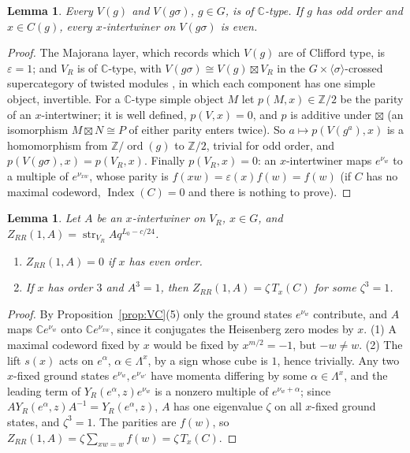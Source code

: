 \documentclass[11pt]{amsart}
\newtheorem{lemma}[theorem]{Lemma}
\theoremstyle{definition}
\newcommand{\Z}{\mathbb{Z}}
\newcommand{\C}{\mathbb{C}}
\newcommand{\Index}{\operatorname{Index}}
\newcommand{\str}{\operatorname{str}}
\begin{document}
\begin{lemma}\label{lem:evenness}
Every $V(g)$ and $V(g\sigma)$, $g\in G$, is of $\C$-type. If $g$ has odd order and $x\in C(g)$, every
$x$-intertwiner on $V(g\sigma)$ is even.
\end{lemma}

\begin{proof}
The Majorana layer, which records which $V(g)$ are of Clifford type, is $\varepsilon=1$; and $V_R$ is of
$\C$-type, with $V(g\sigma)\cong V(g)\boxtimes V_R$ in the $G\times\langle\sigma\rangle$-crossed
supercategory of twisted modules \cite[Thms.~4.15, 4.17]{McRae}, in which each component has one simple
object, invertible. For a $\C$-type simple object $M$ let $p(M,x)\in\Z/2$ be the parity of an
$x$-intertwiner; it is well defined, $p(V,x)=0$, and $p$ is additive under $\boxtimes$ (an isomorphism
$M\boxtimes N\cong P$ of either parity enters twice). So $a\mapsto p(V(g^a),x)$ is a homomorphism from
$\Z/\operatorname{ord}(g)$ to $\Z/2$, trivial for odd order, and $p(V(g\sigma),x)=p(V_R,x)$. Finally
$p(V_R,x)=0$: an $x$-intertwiner maps $e^{\nu_w}$ to a multiple of $e^{\nu_{xw}}$, whose parity is
$f(xw)=\varepsilon(x)f(w)=f(w)$ (if $C$ has no maximal codeword, $\Index(C)=0$ and there is nothing to
prove).
\end{proof}

\begin{lemma}\label{lem:untwisted}
Let $A$ be an $x$-intertwiner on $V_R$, $x\in G$, and $Z_{RR}(1,A)=\str_{V_R}Aq^{L_0-c/24}$.
\begin{enumerate}
\item $Z_{RR}(1,A)=0$ if $x$ has even order.
\item If $x$ has order $3$ and $A^3=1$, then $Z_{RR}(1,A)=\zeta\,T_x(C)$ for some $\zeta^3=1$.
\end{enumerate}
\end{lemma}

\begin{proof}
By Proposition~\ref{prop:VC}(5) only the ground states $e^{\nu_w}$ contribute, and $A$ maps
$\C e^{\nu_w}$ onto $\C e^{\nu_{xw}}$, since it conjugates the Heisenberg zero modes by $x$. (1) A
maximal codeword fixed by $x$ would be fixed by $x^{m/2}=-1$, but $-w\ne w$. (2) The lift $s(x)$ acts on
$e^\alpha$, $\alpha\in\Lambda^x$, by a sign whose cube is $1$, hence trivially. Any two $x$-fixed ground
states $e^{\nu_w},e^{\nu_{w'}}$ have momenta differing by some $\alpha\in\Lambda^x$, and the leading term
of $Y_R(e^\alpha,z)e^{\nu_w}$ is a nonzero multiple of $e^{\nu_w+\alpha}$; since
$AY_R(e^\alpha,z)A^{-1}=Y_R(e^\alpha,z)$, $A$ has one eigenvalue $\zeta$ on all $x$-fixed ground states,
and $\zeta^3=1$. The parities are $f(w)$, so $Z_{RR}(1,A)=\zeta\sum_{xw=w}f(w)=\zeta\,T_x(C)$.
\end{proof}
\end{document}
